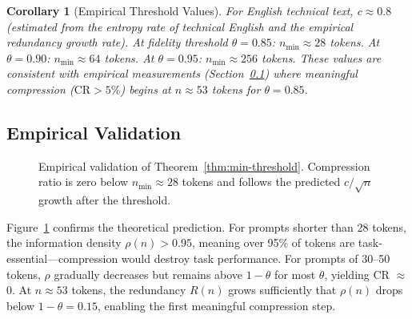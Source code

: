 \documentclass[11pt]{article}
\newtheorem{corollary}[theorem]{Corollary}
\theoremstyle{remark}
\begin{document}
\begin{corollary}[Empirical Threshold Values]
\label{cor:threshold-values}
For English technical text, $c \approx 0.8$ (estimated from the entropy
rate of technical English and the empirical redundancy growth rate).
At fidelity threshold $\theta = 0.85$: $n_{\min} \approx 28$ tokens.
At $\theta = 0.90$: $n_{\min} \approx 64$ tokens. At $\theta = 0.95$:
$n_{\min} \approx 256$ tokens. These values are consistent with empirical
measurements (Section~\ref{sec:threshold-validation}) where meaningful
compression ($\text{CR} > 5\%$) begins at $n \approx 53$ tokens for
$\theta = 0.85$.
\end{corollary}

\subsection{Empirical Validation}
\label{sec:threshold-validation}

\begin{figure}[H]
\centering
{}
\caption{Empirical validation of Theorem~\ref{thm:min-threshold}. Compression
ratio is zero below $n_{\min} \approx 28$ tokens and follows the predicted
$c/\sqrt{n}$ growth after the threshold.}
\label{fig:threshold}
\end{figure}

Figure~\ref{fig:threshold} confirms the theoretical prediction. For prompts
shorter than 28 tokens, the information density $\rho(n) > 0.95$, meaning
over 95\% of tokens are task-essential---compression would destroy task
performance. For prompts of 30--50 tokens, $\rho$ gradually decreases but
remains above $1-\theta$ for most $\theta$, yielding CR $\approx$ 0.
At $n \approx 53$ tokens, the redundancy $R(n)$ grows sufficiently that
$\rho(n)$ drops below $1-\theta = 0.15$, enabling the first meaningful
compression step.
\end{document}
